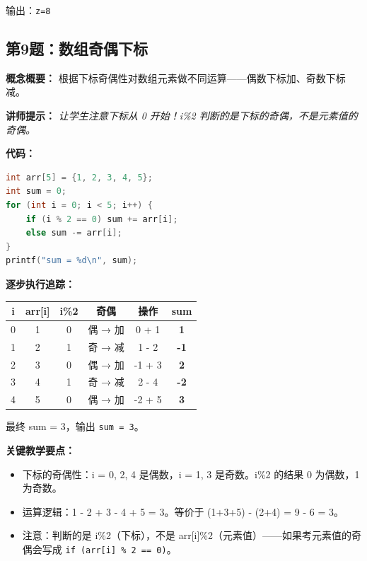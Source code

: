 {\color{highlight}输出：\texttt{z=8}}

\subsection{第9题：数组奇偶下标}

\textbf{概念概要：} 根据下标奇偶性对数组元素做不同运算——偶数下标加、奇数下标减。

\medskip
\textbf{讲师提示：} \textit{让学生注意下标从 0 开始！i\%2 判断的是下标的奇偶，不是元素值的奇偶。}

\smallskip
\textbf{代码：}
\begin{lstlisting}[language=C]
int arr[5] = {1, 2, 3, 4, 5};
int sum = 0;
for (int i = 0; i < 5; i++) {
    if (i % 2 == 0) sum += arr[i];
    else sum -= arr[i];
}
printf("sum = %d\n", sum);
\end{lstlisting}

\smallskip
\textbf{逐步执行追踪：}

\begin{center}
\begin{tabular}{c|c|c|c|c|c}
\hline
\textbf{i} & \textbf{arr[i]} & \textbf{i\%2} & \textbf{奇偶} & \textbf{操作} & \textbf{sum} \\
\hline
0 & 1 & 0 & 偶 → 加 & 0 + 1 & \textbf{1} \\
1 & 2 & 1 & 奇 → 减 & 1 - 2 & \textbf{-1} \\
2 & 3 & 0 & 偶 → 加 & -1 + 3 & \textbf{2} \\
3 & 4 & 1 & 奇 → 减 & 2 - 4 & \textbf{-2} \\
4 & 5 & 0 & 偶 → 加 & -2 + 5 & \textbf{3} \\
\hline
\end{tabular}
\end{center}

\noindent 最终 sum = 3，输出 \texttt{sum = 3}。

\textbf{关键教学要点：}
\begin{itemize}
    \item 下标的奇偶性：i = 0, 2, 4 是偶数，i = 1, 3 是奇数。i\%2 的结果 0 为偶数，1 为奇数。
    \item 运算逻辑：1 - 2 + 3 - 4 + 5 = 3。等价于 (1+3+5) - (2+4) = 9 - 6 = 3。
    \item 注意：判断的是 i\%2（下标），不是 arr[i]\%2（元素值）——如果考元素值的奇偶会写成 \texttt{if (arr[i] \% 2 == 0)}。
\end{itemize}

